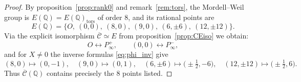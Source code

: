 \documentclass[10pt,a4paper]{amsart}
\begin{document}
\begin{proof}
By proposition~\ref{prop:rank0} and remark~\ref{rem:tors}, the Mordell--Weil group is
$E(\mathbb{Q})=E(\mathbb{Q})_{\mathrm{tors}}$ of order $8$, and its rational points are
\[
E(\mathbb{Q})=\{O,\ (0,0),\ (8,0),\ (9,0),\ (6,\pm6),\ (12,\pm12)\}.
\]
Via the explicit isomorphism $\overline{\mathcal{C}}\simeq E$ from proposition~\ref{prop:CEiso} we obtain:
\[
O\longleftrightarrow P_\infty^+,\qquad (0,0)\longleftrightarrow P_\infty^-,
\]
and for $X\neq0$ the inverse formulas \eqref{eq:phi_inv} give
\[
(8,0)\mapsto (0,-1),\quad (9,0)\mapsto(0,1),\quad
(6,\pm6)\mapsto\bigl(\pm\tfrac12,-6\bigr),\quad
(12,\pm12)\mapsto\bigl(\pm\tfrac12,6\bigr).
\]
Thus $\overline{\mathcal{C}}(\mathbb{Q})$ contains precisely the $8$ points listed.
\end{proof}
\end{document}
